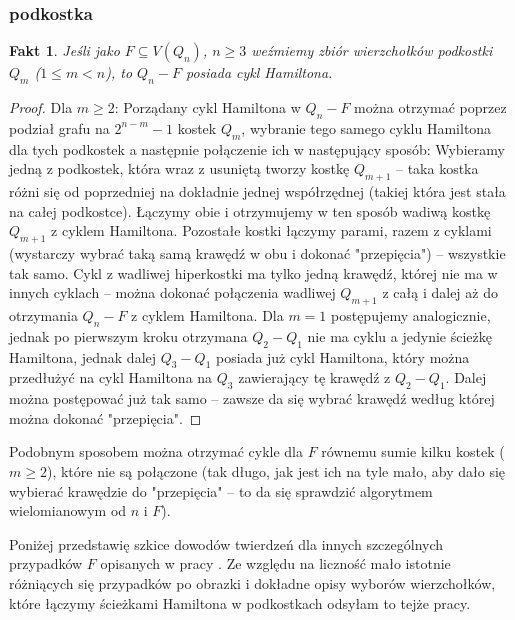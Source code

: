\documentclass{pracamgr}
\newtheorem{fact}[theorem]{Fakt}
\begin{document}
    \subsubsection{podkostka}
     \begin{fact}\label{hamilton dla F=Q_m}
      Jeśli jako $F\subseteq V(Q_n)$, $n\ge3$ weźmiemy zbiór wierzchołków podkostki $Q_m$ ($1\le m<n$), to $Q_n-F$ posiada cykl Hamiltona.
     \end{fact}
     \begin{proof}
      Dla $m\ge2$:\newline 
      Porządany cykl Hamiltona w $Q_n-F$ można otrzymać poprzez podział grafu na $2^{n-m}-1$ kostek $Q_m$, wybranie tego samego cyklu Hamiltona dla tych podkostek
      a następnie połączenie ich w następujący sposób:\newline
      Wybieramy jedną z podkostek, która wraz z usuniętą tworzy kostkę $Q_{m+1}$ -- taka kostka różni się od poprzedniej na dokładnie jednej współrzędnej
      (takiej która jest stała na całej podkostce). Łączymy obie i otrzymujemy w ten sposób wadiwą kostkę $Q_{m+1}$ z cyklem Hamiltona.
      Pozostałe kostki łączymy parami, razem z cyklami (wystarczy wybrać taką samą krawędź w obu i dokonać "przepięcia") -- wszystkie tak samo.
      Cykl z wadliwej hiperkostki ma tylko jedną krawędź, której nie ma w innych cyklach -- można dokonać połączenia wadliwej $Q_{m+1}$ z całą i dalej aż
      do otrzymania $Q_n-F$ z cyklem Hamiltona.\newline
      Dla $m=1$ postępujemy analogicznie, jednak po pierwszym kroku otrzymana $Q_2-Q_1$ nie ma cyklu a jedynie ścieżkę Hamiltona, jednak dalej $Q_3-Q_1$
      posiada już cykl Hamiltona, który można przedłużyć na cykl Hamiltona na $Q_3$ zawierający tę krawędź z $Q_2-Q_1$. Dalej można postępować już tak samo
      -- zawsze da się wybrać krawędź według której można dokonać "przepięcia".
     \end{proof}
     Podobnym sposobem można otrzymać cykle dla $F$ równemu sumie kilku kostek ($m\ge2$), które nie są połączone (tak długo, jak jest ich na tyle mało,
     aby dało się wybierać krawędzie do "przepięcia" -- to da się sprawdzić algorytmem wielomianowym od $n$ i $F$).\newline
    
    Poniżej przedstawię szkice dowodów twierdzeń dla innych szczególnych przypadków $F$ opisanych w pracy \cite{Pegr}.
    Ze względu na liczność mało istotnie różniących się przypadków po obrazki i dokładne opisy wyborów wierzchołków,
    które łączymy ścieżkami Hamiltona w podkostkach odsyłam to tejże pracy.
\end{document}
